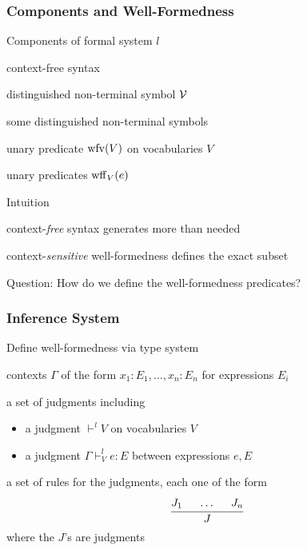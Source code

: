 
\begin{frame}\frametitle{Components and Well-Formedness}
\begin{blockitems}{Components of formal system $l$}
 \item context-free syntax
 \item distinguished non-terminal symbol $\mathcal{V}$ 
 \item some distinguished non-terminal symbols 
 \item unary predicate $\mathrm{wfv}(V)$ on vocabularies $V$ 
 \item unary predicates $\mathrm{wff}_{V}(e)$ 
\end{blockitems}

\begin{blockitems}{Intuition}
\item context-\emph{free} syntax generates more than needed
\item context-\emph{sensitive} well-formedness defines the exact subset
\end{blockitems}

Question: How do we define the well-formedness predicates?
\end{frame}

\begin{frame}\frametitle{Inference System}
\begin{blockitems}{Define well-formedness via type system}
\item contexts $\Gamma$ of the form $x_1:E_1,\ldots,x_n:E_n$ for expressions $E_i$
\item a set of judgments including
 \begin{itemize}
  \item a judgment $\vdash^l V$ on vocabularies $V$
  \item a judgment $\Gamma\vdash^l_V e:E$ between expressions $e,E$
 \end{itemize}
\item a set of rules for the judgments, each one of the form
\[\cfrac{J_1 \hspace*{.5cm} \ldots \hspace*{.5cm} J_n}{J}\,\]
where the $J$'s are judgments
\end{blockitems}
\end{frame}

